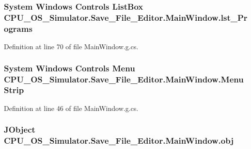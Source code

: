 \subsubsection[{lst\+\_\+\+Programs}]{\setlength{\rightskip}{0pt plus 5cm}System Windows Controls List\+Box C\+P\+U\+\_\+\+O\+S\+\_\+\+Simulator.\+Save\+\_\+\+File\+\_\+\+Editor.\+Main\+Window.\+lst\+\_\+\+Programs\hspace{0.3cm}{\ttfamily [package]}}\label{class_c_p_u___o_s___simulator_1_1_save___file___editor_1_1_main_window_af63f60251391d783dcb3cab281076e38}


Definition at line 70 of file Main\+Window.\+g.\+cs.

\hypertarget{class_c_p_u___o_s___simulator_1_1_save___file___editor_1_1_main_window_ad7217e9c5af484ec701b1f9ffdedb38d}{}
\subsubsection[{Menu\+Strip}]{\setlength{\rightskip}{0pt plus 5cm}System Windows Controls Menu C\+P\+U\+\_\+\+O\+S\+\_\+\+Simulator.\+Save\+\_\+\+File\+\_\+\+Editor.\+Main\+Window.\+Menu\+Strip\hspace{0.3cm}{\ttfamily [package]}}\label{class_c_p_u___o_s___simulator_1_1_save___file___editor_1_1_main_window_ad7217e9c5af484ec701b1f9ffdedb38d}


Definition at line 46 of file Main\+Window.\+g.\+cs.

\hypertarget{class_c_p_u___o_s___simulator_1_1_save___file___editor_1_1_main_window_ac5dbce1cf34490c083f76ec1018b99e9}{}
\subsubsection[{obj}]{\setlength{\rightskip}{0pt plus 5cm}J\+Object C\+P\+U\+\_\+\+O\+S\+\_\+\+Simulator.\+Save\+\_\+\+File\+\_\+\+Editor.\+Main\+Window.\+obj\hspace{0.3cm}{\ttfamily [private]}}\label{class_c_p_u___o_s___simulator_1_1_save___file___editor_1_1_main_window_ac5dbce1cf34490c083f76ec1018b99e9}


